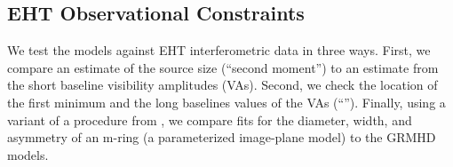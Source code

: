 
\subsection{EHT Observational Constraints}




We test the models against EHT interferometric data in three ways.
First, we compare an estimate of the source size (``second moment'')
to an estimate from the short baseline visibility amplitudes (VAs).
Second, we check the location of the first minimum and the long
baselines values of the VAs (``\vam'').
Finally, using a variant of a procedure from , we
compare fits for the diameter, width, and asymmetry of an m-ring (a
parameterized image-plane model) to the GRMHD models.


